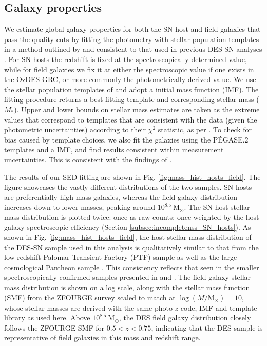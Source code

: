 \documentclass[fleqn,usenatbib]{mnras}
\begin{document}
\subsection{Galaxy properties \label{subsec:properties}}

We estimate global galaxy properties for both the SN host and field galaxies that pass the quality cuts by fitting the photometry with stellar population templates in a method outlined by \citet{Sullivan2006} and consistent to that used in previous DES-SN analyses \citep{Smith2020,Wiseman2020,Kelsey2021}. For SN hosts the redshift is fixed at the spectroscopically determined value, while for field galaxies we fix it at either the spectroscopic value if one exists in the OzDES GRC, or more commonly the photometrically derived value. We use the stellar population templates of \citet{Bruzual2003} and adopt a \citet{Chabrier2003} initial mass function (IMF). The fitting procedure returns a best fitting template and corresponding stellar mass ($M_*$). Upper and lower bounds on stellar mass estimates are taken as the extreme values that correspond to templates that are consistent with the data (given the photometric uncertainties) according to their $\chi^2$ statistic, as per \citet{Sullivan2006}. To check for bias caused by template choices, we also fit the galaxies using the P\'EGASE.2 templates \citep{Fioc1997,LeBorgne2002} and a \citet{Kroupa2001} IMF, and find results consistent within measurement uncertainties. This is consistent with the findings of \citet{Smith2020}. 

The results of our SED fitting are shown in Fig. \ref{fig:mass_hist_hosts_field}. The figure showcases the vastly different distributions of the two samples. SN hosts are preferentially high mass galaxies, whereas the field galaxy distribution increases down to lower masses, peaking around $10^{8.5}~\mathrm{M}_{\odot}$. The SN host stellar mass distribution is plotted twice: once as raw counts; once weighted by the host galaxy spectroscopic efficiency (Section \ref{subsec:incompletenss_SN_hosts}). As shown in Fig. \ref{fig:mass_hist_hosts_field}, the host stellar mass distribution of the DES-SN sample used in this analysis is qualitatively similar to that from the low redshift Palomar Transient Factory (PTF) sample \citep{Pan2014} as well as the large cosmological Pantheon sample \citep{Scolnic2018}. This consistency reflects that seen in the smaller spectroscopically confirmed samples presented in \citet{Wiseman2020} and \citet{Smith2020}. The field galaxy stellar mass distribution is shown on a log scale, along with the stellar mass function (SMF) from the ZFOURGE survey \citep{Tomczak2014} scaled to match at $\log (M/\mathrm{M}_{\odot}) = 10$, whose stellar masses are derived with the same photo-$z$ code, IMF and template library as used here. Above $10^{8.5}~\mathrm{M}_{\odot}$, the DES field galaxy distribution closely follows the ZFOURGE SMF for $0.5<z<0.75$, indicating that the DES sample is representative of field galaxies in this mass and redshift range.
\end{document}
